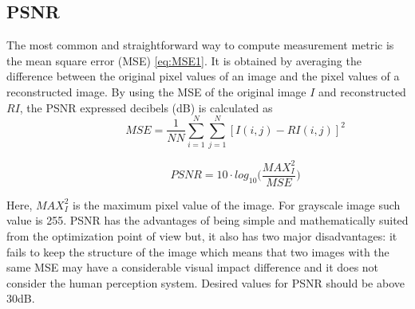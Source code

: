 \subsection{PSNR} 
The most common and straightforward way to compute measurement metric is the mean square error (MSE) \ref{eq:MSE1}. It is obtained by averaging the difference between the original pixel values of an image and the pixel values of a reconstructed image. By using the MSE of the original image $I$ and reconstructed $RI$, the PSNR expressed decibels (dB) is calculated as
\begin{equation} \label{eq:mse1}
\hspace{3em} \hspace{3em} \hspace{3em} MSE = \frac{1}{NN} \sum\limits_{i=1}^N \sum\limits_{j=1}^N [ I( i , j) - RI ( i , j ) ]^2    \enspace \enspace \hspace{3em}
\end{equation} 

\begin{equation} \label{eq:LS1}
\hspace{3em} \hspace{3em} \hspace{3em} PSNR = 10 \cdot log_{10} \bigg( \frac{ MAX_{I}^{2} }{MSE} \bigg) \enspace \enspace \hspace{3em}
\end{equation} 

Here, $MAX_{I}^{2}$ is the maximum pixel value of the image. For grayscale image such value is 255. PSNR has the advantages of being simple and mathematically suited from the optimization point of view but, it also has two major disadvantages: it fails to keep the structure of the image which means that two images with the same MSE may have a considerable visual impact difference and it does not consider the human perception system. Desired values for PSNR should be above 30dB. 

